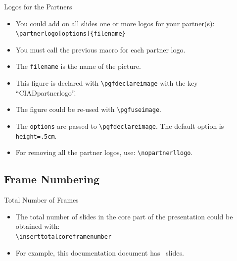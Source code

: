 \documentclass[english,sectioncirclenumberstyle]{ciadbeamer}
\begin{document}
\begin{frame}{Logos for the Partners}
	\begin{itemize}
	\item You could add on all slides one or more logos for your partner(s): \\
		\texttt{{\textbackslash}partnerlogo[options]\{filename\}}
	\item You must call the previous macro for each partner logo.
	\item The \texttt{filename} is the name of the picture.
	\vspace{1em}
	\item This figure is declared with \texttt{{\textbackslash}pgfdeclareimage} with the key ``CIADpartnerlogo''.
	\item The figure could be re-used with \texttt{{\textbackslash}pgfuseimage}.
	\item The \texttt{options} are passed to \texttt{{\textbackslash}pgfdeclareimage}. The default option is \texttt{height=.5cm}.
	\item For removing all the partner logos, use: \texttt{{\textbackslash}nopartnerllogo}.
	\end{itemize}
\end{frame}


\subsection{Frame Numbering}

\begin{frame}{Total Number of Frames}
	\begin{itemize}
	\item The total number of slides in the core part of the presentation could be obtained with: \\
		\texttt{{\textbackslash}inserttotalcoreframenumber}
	\item For example, this documentation document has \inserttotalcoreframenumber\ slides.
	\end{itemize}
\end{frame}
\end{document}
